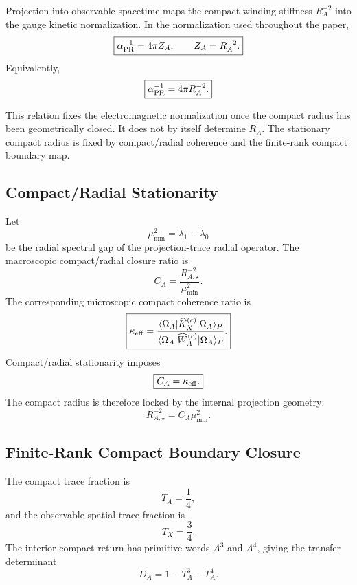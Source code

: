 \documentclass[11pt]{article}
\begin{document}
Projection into observable spacetime maps the compact winding stiffness
\(R_A^{-2}\) into the gauge kinetic normalization. In the normalization used
throughout the paper,
\begin{equation}
\boxed{
\alpha_{\rm PR}^{-1}
=
4\pi Z_A,
\qquad
Z_A=R_A^{-2}.
}
\end{equation}
Equivalently,
\begin{equation}
\boxed{
\alpha_{\rm PR}^{-1}
=
4\pi R_A^{-2}.
}
\end{equation}

This relation fixes the electromagnetic normalization once the compact radius
has been geometrically closed. It does not by itself determine \(R_A\). The
stationary compact radius is fixed by compact/radial coherence and the
finite-rank compact boundary map.

\subsection{Compact/Radial Stationarity}

Let
\begin{equation}
\boxed{
\mu_{\min}^2
=
\lambda_1-\lambda_0
}
\end{equation}
be the radial spectral gap of the projection-trace radial operator. The
macroscopic compact/radial closure ratio is
\begin{equation}
\boxed{
C_A
=
\frac{R_{A,\star}^{-2}}{\mu_{\min}^2}.
}
\end{equation}
The corresponding microscopic compact coherence ratio is
\begin{equation}
\boxed{
\kappa_{\rm eff}
=
\frac{
\langle\Omega_A|\widehat K_X^{(c)}|\Omega_A\rangle_P
}{
\langle\Omega_A|\widehat W_A^{(c)}|\Omega_A\rangle_P
}.
}
\end{equation}
Compact/radial stationarity imposes
\begin{equation}
\boxed{
C_A
=
\kappa_{\rm eff}.
}
\end{equation}
The compact radius is therefore locked by the internal projection geometry:
\begin{equation}
\boxed{
R_{A,\star}^{-2}
=
C_A\mu_{\min}^2.
}
\end{equation}

\subsection{Finite-Rank Compact Boundary Closure}

The compact trace fraction is
\begin{equation}
\boxed{
T_A=\frac14,
}
\end{equation}
and the observable spatial trace fraction is
\begin{equation}
\boxed{
T_X=\frac34.
}
\end{equation}
The interior compact return has primitive words \(A^3\) and \(A^4\), giving
the transfer determinant
\begin{equation}
\boxed{
D_A
=
1-T_A^3-T_A^4.
}
\end{equation}
\end{document}
